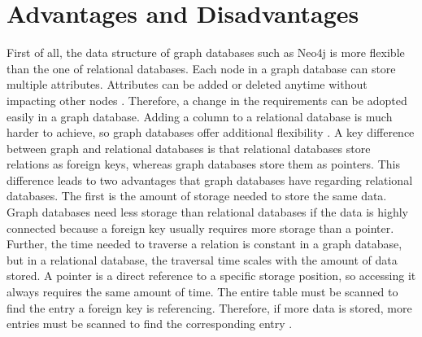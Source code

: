 \section{Advantages and Disadvantages} \label{sec:advantagesDisadvantagesNeo4j}

First of all, the data structure of graph databases such as Neo4j is more flexible than the one of relational databases. Each node in a graph database can store multiple attributes. Attributes can be added or deleted anytime without impacting other nodes \parencite{adv_and_disadv_neo4j}. Therefore, a change in the requirements can be adopted easily in a graph database. Adding a column to a relational database is much harder to achieve, so graph databases offer additional flexibility \parencite{diff_rela_neo4j}.
A key difference between graph and relational databases is that relational databases store relations as foreign keys, whereas graph databases store them as pointers. This difference leads to two advantages that graph databases have regarding relational databases. The first is the amount of storage needed to store the same data. Graph databases need less storage than relational databases if the data is highly connected because a foreign key usually requires more storage than a pointer. Further, the time needed to traverse a relation is constant in a graph database, but in a relational database, the traversal time scales with the amount of data stored. A pointer is a direct reference to a specific storage position, so accessing it always requires the same amount of time. The entire table must be scanned to find the entry a foreign key is referencing. Therefore, if more data is stored, more entries must be scanned to find the corresponding entry \parencite{diff_rela_neo4j}.


